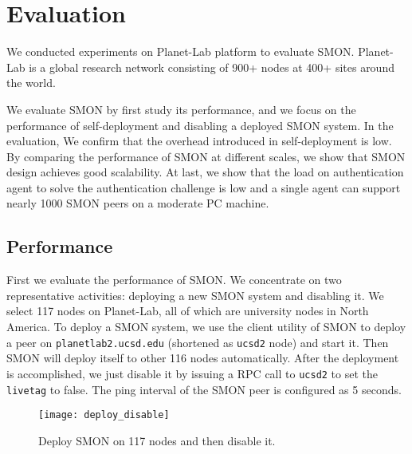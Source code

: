 \section{Evaluation}
\label{sec:eval}

We conducted experiments on Planet-Lab platform to evaluate
SMON. Planet-Lab is a global research network consisting of
900+ nodes at 400+ sites around the world.

We evaluate SMON by first study its performance, and we
focus on the performance of self-deployment and disabling a
deployed SMON system. In the evaluation, We confirm that the
overhead introduced in self-deployment is low. By comparing
the performance of SMON at different scales, we show that
SMON design achieves good scalability. At last, we show that
the load on authentication agent to solve the authentication
challenge is low and a single agent can support nearly 1000
SMON peers on a moderate PC machine.

%

\subsection{Performance}

First we evaluate the performance of SMON. We concentrate on
two representative activities: deploying a new SMON system
and disabling it. We select 117 nodes on Planet-Lab, all of
which are university nodes in North America. To deploy a
SMON system, we use the client utility of SMON to deploy a
peer on \texttt{planet\-lab2.ucsd.edu} (shortened as
\texttt{ucsd2} node) and start it. Then SMON will deploy
itself to other 116 nodes automatically. After the
deployment is accomplished, we just disable it by issuing a
RPC call to \texttt{ucsd2} to set the \texttt{livetag} to
false.  The ping interval of the SMON peer is configured as
5 seconds.

\begin{figure}%
\centering
\texttt{[image: deploy\_disable]}
\caption{Deploy SMON on 117 nodes and then disable it.}
\label{fig:smonperf}
\end{figure}

